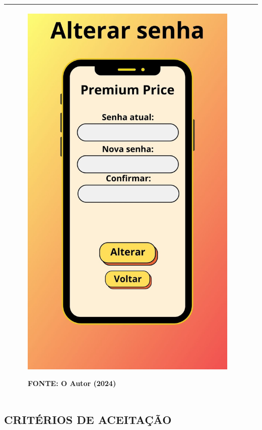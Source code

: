 \begin{tabular}{|ll|}
\begin{minipage}{0.48\textwidth}
\begin{figure}[H]
\includegraphics[width=\textwidth]{fig/telas/t_altsenha.jpg}
\footnotesize \centering
\par FONTE: O Autor (2024)
\end{figure}
\end{minipage}
 \\ \hline
\end{tabular}

\subsection*{\textbf{CRITÉRIOS DE ACEITAÇÃO}}

